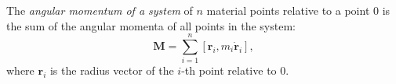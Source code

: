 The \textit{angular momentum of a system} of $n$ material points relative to a point $0$ is the sum of the angular momenta of all points in the system:
$$\mathbf{M} = \sum_{i=1}^{n} [\mathbf{r}_i, m_i \dot{\mathbf{r}}_i],$$
where $\mathbf{r}_i$ is the radius vector of the $i$-th point relative to $0$.
